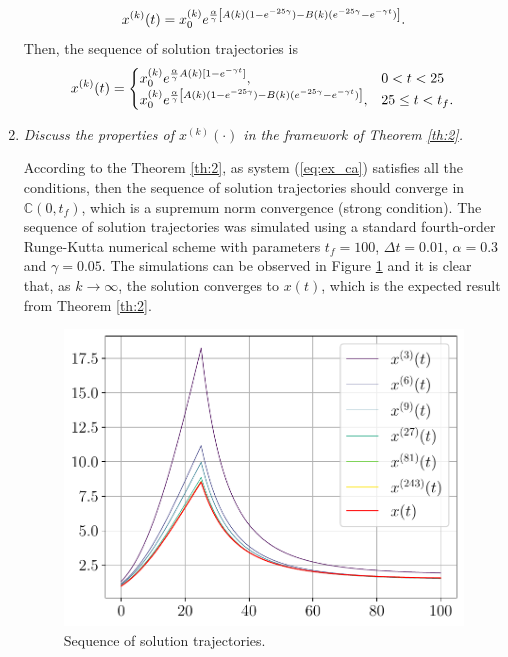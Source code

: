 \documentclass[11pt,letterpaper]{article}
\newcommand{\CC}{{\mathbb{C}}}
\let\originalleft\left
\let\originalright\right
\renewcommand{\left}{\mathopen{}\mathclose\bgroup\originalleft}
\renewcommand{\right}{\aftergroup\egroup\originalright}
\theoremstyle{definition}
\begin{document}
\begin{enumerate}[label=\alph*)]
\begin{equation}
        x^{(k)}(t)=x_0^{(k)}e^{\frac{\alpha}{\gamma}\left[A(k)(1-e^{-25\gamma})-B(k)(e^{-25\gamma} - e^{-\gamma t})\right]}. 
    \end{equation}
    Then, the sequence of solution trajectories is
    \begin{equation}
        x^{(k)}(t)=\begin{cases}
            x_0^{(k)}e^{\frac{\alpha}{\gamma}A(k)[1-e^{-\gamma t}]},&0<t<25\\
            x_0^{(k)}e^{\frac{\alpha}{\gamma}\left[A(k)(1-e^{-25\gamma})-B(k)(e^{-25\gamma} - e^{-\gamma t})\right]}, &25\leq t<t_f.
        \end{cases}
    \end{equation}
    
    \item \textit{Discuss the properties of $x^{(k)}(\cdot)$ in the framework of Theorem \ref{th:2}.}
    
    According to the Theorem \ref{th:2}, as system (\ref{eq:ex_ca}) satisfies all the conditions, then the sequence of solution trajectories should converge in $\CC(0,t_f)$, which is a supremum norm convergence (strong condition). The sequence of solution trajectories was simulated using a standard fourth-order Runge-Kutta numerical scheme with parameters $t_f=100$, $\Delta t=0.01$, $\alpha=0.3$ and $\gamma=0.05$. The simulations can be observed in Figure \ref{fig:th2} and it is clear that, as $k\rightarrow\infty$, the solution converges to $x(t)$, which is the expected result from Theorem \ref{th:2}.
    
    \begin{figure}[H]
        \centering
        \includegraphics[scale=.7]{figs/theorem2.pdf}
        \caption{Sequence of solution trajectories.}
        \label{fig:th2}
    \end{figure}
    
\end{enumerate}
\end{document}
